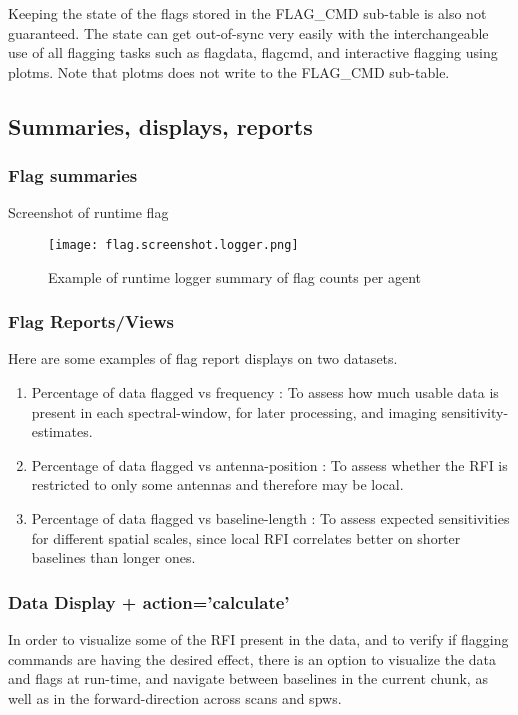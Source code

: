 Keeping the state of the flags stored in the FLAG\_CMD sub-table is also not
guaranteed. The state can get out-of-sync very easily with the interchangeable
use of all flagging tasks such as flagdata, flagcmd, and interactive
flagging using plotms. Note that plotms does not write to the FLAG\_CMD
sub-table.


\subsection{Summaries, displays, reports}

\subsubsection{Flag summaries}

Screenshot of runtime flag 
\begin{figure}
\texttt{[image: flag.screenshot.logger.png]}
\caption{Example of runtime logger summary of flag counts per agent}
\end{figure}

\subsubsection{Flag Reports/Views}

Here are some examples of flag report displays on two datasets.
\begin{enumerate}
\item Percentage of data flagged vs frequency : To assess how much usable data is present in each spectral-window, for later processing, and imaging sensitivity-estimates.
\item Percentage of data flagged vs antenna-position : To assess whether the RFI is restricted to only some antennas and therefore may be local.
\item Percentage of data flagged vs baseline-length : To assess expected sensitivities for different spatial scales, since local RFI correlates better on shorter baselines than longer ones.
\end{enumerate}

\subsubsection{Data Display + action='calculate'}
In order to visualize some of the RFI present in the data, and to verify if flagging
commands are having the desired effect,  there is an option to 
visualize the data and flags at run-time, and navigate between baselines in the 
current chunk, as well as in the forward-direction across scans and spws.   

